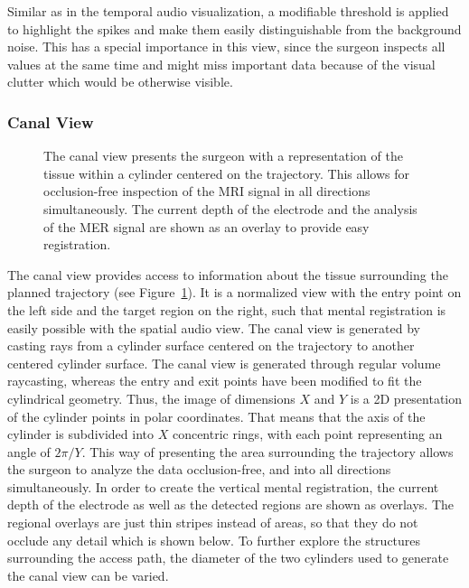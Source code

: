\documentclass{vgtc}                          %
\begin{document}
Similar as in the temporal audio visualization, a modifiable threshold is applied to highlight the spikes and make them easily distinguishable from the background noise. This has a special importance in this view, since the surgeon inspects all values at the same time and might miss important data because of the visual clutter which would be otherwise visible.


\subsubsection{Canal View}\label{sec:overview:placement:canal}

\begin{figure}[b]
    \centering
    \caption{The canal view presents the surgeon with a representation of the tissue within a cylinder centered on the trajectory. This allows for occlusion-free inspection of the MRI signal in all directions simultaneously. The current depth of the electrode and the analysis of the MER signal are shown as an overlay to provide easy registration.}
    \label{fig:placementphase:canal}
\end{figure}

The canal view provides access to information about the tissue surrounding the planned trajectory (see Figure~\ref{fig:placementphase:canal}). It is a normalized view with the entry point on the left side and the target region on the right, such that mental registration is easily possible with the spatial audio view. The canal view is generated by casting rays from a cylinder surface centered on the trajectory to another centered cylinder surface. The canal view is generated through regular volume raycasting, whereas the entry and exit points have been modified to fit the cylindrical geometry. Thus, the image of dimensions $X$ and $Y$ is a 2D presentation of the cylinder points in polar coordinates. That means that the axis of the cylinder is subdivided into $X$ concentric rings, with each point representing an angle of $2 \pi / Y$. This way of presenting the area surrounding the trajectory allows the surgeon to analyze the data occlusion-free, and into all directions simultaneously. In order to create the vertical mental registration, the current depth of the electrode as well as the detected regions are shown as overlays. The regional overlays are just thin stripes instead of areas, so that they do not occlude any detail which is shown below. To further explore the structures surrounding the access path, the diameter of the two cylinders used to generate the canal view can be varied. 
\end{document}
